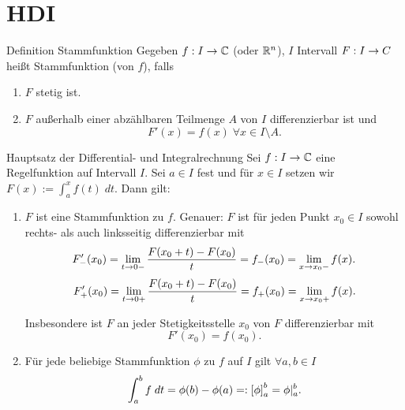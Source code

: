 \documentclass[main.tex]{subfiles}
\begin{document}
\section*{HDI}

\begin{karte}{Definition Stammfunktion}
    Gegeben \( \abb{f}{I}{\C} \) (oder \( \R^n \)), 
    \(I\) Intervall    
    \( \abb{F}{I}{C} \) heißt Stammfunktion (von \(f\)), falls
    \begin{enumerate}
        \item \(F\) stetig ist.
        \item \(F\) außerhalb einer abzählbaren Teilmenge 
        \( A \) von \( I \) differenzierbar ist und 
        \[ F'(x) = f(x) \; \forall x\in I \setminus A. \]
    \end{enumerate}
\end{karte}

\begin{karte}{Hauptsatz der Differential- und Integralrechnung}
    Sei \( \abb{f}{I}{\C} \) eine Regelfunktion 
    auf Intervall \(I\). Sei \(a \in I\) fest und 
    für \( x\in I \) setzen wir 
    \( F(x) := \int_a^x f(t) \; dt. \)
    Dann gilt: 
    \begin{enumerate}
        \item \(F\) ist eine Stammfunktion zu \(f\).
        Genauer: \( F \) ist für jeden Punkt 
        \( x_0 \in I \) sowohl rechts- als auch linksseitig 
        differenzierbar mit 
        \[ F'_-(x_0) = \limesx{t}{0-} 
        \frac{F(x_0 + t) - F(x_0)}{t} 
        = f_-(x_0) = \limesx{x}{x_0-} f(x). \]
        \[ F'_+(x_0) = \limesx{t}{0+} 
        \frac{F(x_0 + t) - F(x_0)}{t} 
        = f_+(x_0) = \limesx{x}{x_0+} f(x). \]
        
        Insbesondere ist \(F\) an jeder Stetigkeitsstelle 
        \( x_0 \) von \(F\) differenzierbar mit 
        \[ F'(x_0) = f(x_0). \]
        \item Für jede beliebige Stammfunktion \(\phi \) 
        zu \(f\) auf \(I\) gilt \( \forall a,b \in I \)
        \[ \integralx{f}{a}{b}{t} = \phi(b)-\phi(a) 
        =: \left[ \phi \right]^b_a = \phi \vert_a^b. \]
    \end{enumerate}
\end{karte}
\end{document}
